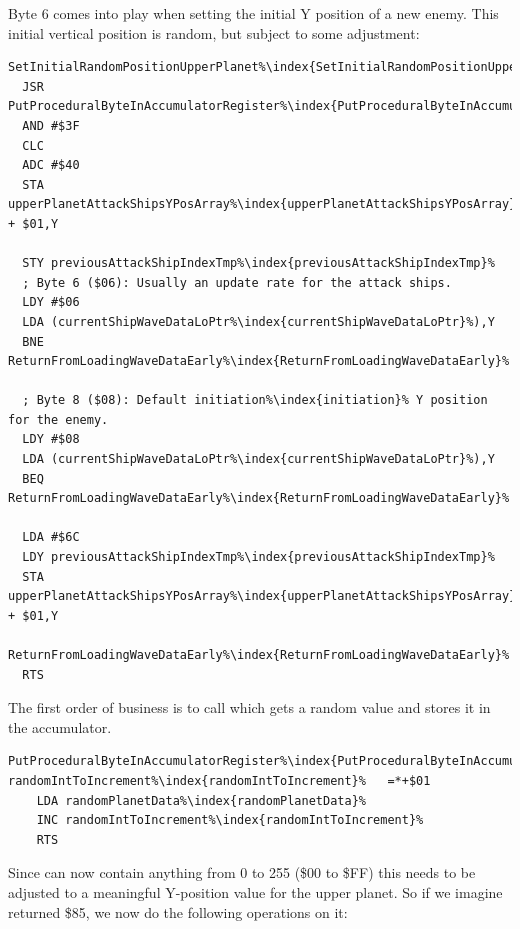 Byte 6 comes into play when setting the initial Y position of a new enemy. This initial vertical
position is random, but subject to some adjustment:

\begin{lstlisting}[caption=The sub-routine\index{routine} \icode{SetInitialRandomPositionUpperPlanet\index{SetInitialRandomPositionUpperPlanet}} in \icode{GetWaveDateForNewShip\index{GetWaveDateForNewShip}}.  ,escapechar=\%]
SetInitialRandomPositionUpperPlanet%\index{SetInitialRandomPositionUpperPlanet}%   
  JSR PutProceduralByteInAccumulatorRegister%\index{PutProceduralByteInAccumulatorRegister}%
  AND #$3F
  CLC
  ADC #$40
  STA upperPlanetAttackShipsYPosArray%\index{upperPlanetAttackShipsYPosArray}% + $01,Y

  STY previousAttackShipIndexTmp%\index{previousAttackShipIndexTmp}%
  ; Byte 6 ($06): Usually an update rate for the attack ships.
  LDY #$06
  LDA (currentShipWaveDataLoPtr%\index{currentShipWaveDataLoPtr}%),Y
  BNE ReturnFromLoadingWaveDataEarly%\index{ReturnFromLoadingWaveDataEarly}%

  ; Byte 8 ($08): Default initiation%\index{initiation}% Y position for the enemy. 
  LDY #$08
  LDA (currentShipWaveDataLoPtr%\index{currentShipWaveDataLoPtr}%),Y
  BEQ ReturnFromLoadingWaveDataEarly%\index{ReturnFromLoadingWaveDataEarly}%

  LDA #$6C
  LDY previousAttackShipIndexTmp%\index{previousAttackShipIndexTmp}%
  STA upperPlanetAttackShipsYPosArray%\index{upperPlanetAttackShipsYPosArray}% + $01,Y

ReturnFromLoadingWaveDataEarly%\index{ReturnFromLoadingWaveDataEarly}%   
  RTS
\end{lstlisting}

The first order of business is to call  which gets a random value and stores it in the accumulator.

\begin{lstlisting}[escapechar=\%]
PutProceduralByteInAccumulatorRegister%\index{PutProceduralByteInAccumulatorRegister}%
randomIntToIncrement%\index{randomIntToIncrement}%   =*+$01
    LDA randomPlanetData%\index{randomPlanetData}%
    INC randomIntToIncrement%\index{randomIntToIncrement}%
    RTS
\end{lstlisting}

Since  can now contain anything from 0 to 255 (\$00 to \$FF) this needs to be adjusted to a meaningful Y-position
value for the upper planet. So if we imagine  returned \$85, we now do the
following operations on it:

